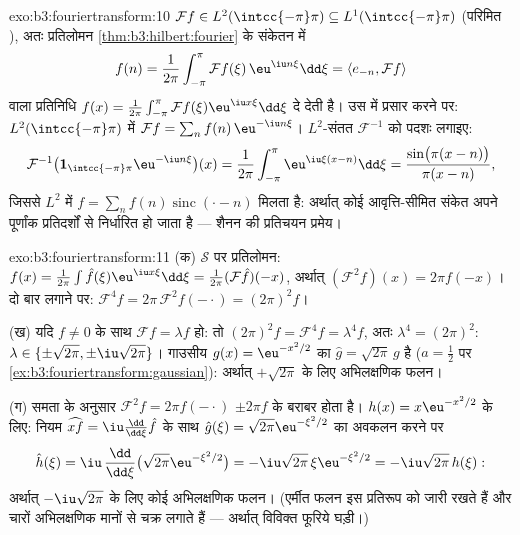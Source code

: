 \begin{solution}{exo:b3:fouriertransform:10}
$\mathcal Ff \in L^2(\intcc{-\pi}\pi) \subseteq
L^1(\intcc{-\pi}\pi)$ (परिमित ), अतः प्रतिलोमन \cref{thm:b3:hilbert:fourier} के संकेतन में
\[
f(n) = \frac1{2\pi}\int_{-\pi}^{\pi}\mathcal
Ff(\xi)\,\eu^{\iu n\xi}\dd\xi = \langle e_{-n}, \mathcal
Ff\rangle
\]
वाला  प्रतिनिधि $f(x) =
\frac1{2\pi}\int_{-\pi}^\pi\mathcal Ff(\xi)\eu^{\iu
x\xi}\dd\xi$ दे देती है। उस  में प्रसार
करने पर: $L^2(\intcc{-\pi}\pi)$ में $\mathcal Ff = \sum_nf(n)\,\eu^{-\iu
n\xi}$। $L^2$-संतत $\mathcal F^{-1}$ को पदशः लगाइए:
\[
\mathcal F^{-1}\bigl(\mathbf
1_{\intcc{-\pi}\pi}\eu^{-\iu n\xi}\bigr)(x)
= \frac1{2\pi}\int_{-\pi}^{\pi}\eu^{\iu\xi(x - n)}\dd\xi
= \frac{\sin\bigl(\pi(x-n)\bigr)}{\pi(x - n)} ,
\]
जिससे $L^2$ में $f = \sum_nf(n)\operatorname{sinc}(\cdot - n)$ मिलता है: अर्थात् कोई आवृत्ति-सीमित संकेत अपने
पूर्णांक प्रतिदर्शों से निर्धारित हो जाता है --- शैनन की प्रतिचयन
प्रमेय।
\end{solution}

\begin{solution}{exo:b3:fouriertransform:11}
(क) $\mathcal S$ पर प्रतिलोमन: $f(x) =
\frac1{2\pi}\int\hat f(\xi)\eu^{\iu x\xi}\dd\xi =
\frac1{2\pi}(\mathcal F\hat f)(-x)$, अर्थात् $(\mathcal
F^2f)(x) = 2\pi f(-x)$। दो बार लगाने पर: $\mathcal F^4f =
2\pi\,\mathcal F^2f(-\cdot) = (2\pi)^2f$।

(ख) यदि $f \neq 0$ के साथ $\mathcal Ff = \lambda f$ हो: तो $(2\pi)^2f = \mathcal F^4f = \lambda^4f$, अतः $\lambda^4 =
(2\pi)^2$: $\lambda \in \{\pm\sqrt{2\pi},
\pm\iu\sqrt{2\pi}\}$। गाउसीय
$g(x) = \eu^{-x^2/2}$ का
$\hat g = \sqrt{2\pi}\,g$
है ($a = \frac12$ पर \cref{ex:b3:fouriertransform:gaussian}): अर्थात् $+\sqrt{2\pi}$ के लिए अभिलक्षणिक फलन।

(ग) समता के अनुसार $\mathcal F^2f = 2\pi f(-\cdot)$ $\pm2\pi f$ के बराबर होता है। $h(x) = x\eu^{-x^2/2}$ के लिए: नियम
$\widehat{xf} = \iu\frac{\dd}{\dd\xi}\hat f$ के साथ $\hat g(\xi) = \sqrt{2\pi}\eu^{-\xi^2/2}$ का अवकलन करने पर
\[
\hat h(\xi) = \iu\,\frac{\dd}{\dd\xi}\bigl(\sqrt{2\pi}
\eu^{-\xi^2/2}\bigr) = -\iu\sqrt{2\pi}\,\xi\eu^{-\xi^2/2}
= -\iu\sqrt{2\pi}\,h(\xi) :
\]
अर्थात् $-\iu\sqrt{2\pi}$ के लिए कोई अभिलक्षणिक फलन। (एर्मीत फलन इस प्रतिरूप को
जारी रखते हैं और चारों अभिलक्षणिक मानों से चक्र लगाते हैं --- अर्थात्
विविक्त फूरिये घड़ी।)

\end{solution}

